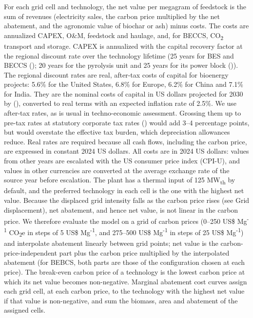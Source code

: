 \documentclass[
  letterpaper,
]{article}
\begin{document}
For each grid cell and technology, the net value per megagram of
feedstock is the sum of revenues (electricity sales, the carbon price
multiplied by the net abatement, and the agronomic value of biochar or
ash) minus costs. The costs are annualized CAPEX, O\&M, feedstock and
haulage, and, for BECCS, CO\textsubscript{2} transport and storage.
CAPEX is annualized with the capital recovery factor at the regional
discount rate over the technology lifetime (25 years for BES and BECCS
(); 20 years for the pyrolysis unit and
25 years for its power block
()). The regional discount
rates are real, after-tax costs of capital for bioenergy projects: 5.6\%
for the United States, 6.8\% for Europe, 6.2\% for China and 7.1\% for
India. They are the nominal costs of capital in US dollars projected for
2030 by (), converted to real terms
with an expected inflation rate of 2.5\%. We use after-tax rates, as is
usual in techno-economic assessment. Grossing them up to pre-tax rates
at statutory corporate tax rates ()
would add 3--4 percentage points, but would overstate the effective tax
burden, which depreciation allowances reduce. Real rates are required
because all cash flows, including the carbon price, are expressed in
constant 2024 US dollars. All costs are in 2024 US dollars: values from
other years are escalated with the US consumer price index (CPI-U), and
values in other currencies are converted at the average exchange rate of
the source year before escalation. The plant has a thermal input of 125
MW\textsubscript{th} by default, and the preferred technology in each
cell is the one with the highest net value. Because the displaced grid
intensity falls as the carbon price rises (see Grid displacement), net
abatement, and hence net value, is not linear in the carbon price. We
therefore evaluate the model on a grid of carbon prices (0--250 US\$
Mg\textsuperscript{-1} CO\textsubscript{2}e in steps of 5 US\$
Mg\textsuperscript{-1}, and 275--500 US\$ Mg\textsuperscript{-1} in
steps of 25 US\$ Mg\textsuperscript{-1}) and interpolate abatement
linearly between grid points; net value is the carbon-price-independent
part plus the carbon price multiplied by the interpolated abatement (for
BEBCS, both parts are those of the configuration chosen at each price).
The break-even carbon price of a technology is the lowest carbon price
at which its net value becomes non-negative. Marginal abatement cost
curves assign each grid cell, at each carbon price, to the technology
with the highest net value if that value is non-negative, and sum the
biomass, area and abatement of the assigned cells.
\end{document}

